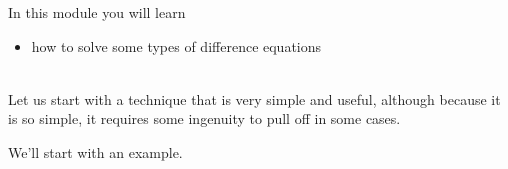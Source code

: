 In this module you will learn
\begin{itemize}
	\item how to solve some types of difference equations
\end{itemize}

\hfill \\




%
%


Let us start with a technique that is very simple and useful, although because it is so simple, it requires some ingenuity to pull off in some cases. \\


We'll start with an example.

